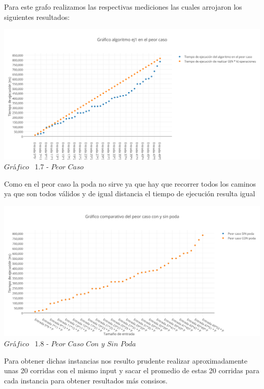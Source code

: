 Para este grafo realizamos las respectivas mediciones las cuales arrojaron los siguientes resultados:\\


\vspace*{0.3cm} \vspace*{0.3cm}
  \begin{center}
\includegraphics[scale=0.65]{./EJ1/peorcaso.png}
{$Gr$\'a$fico$ \ 1.7 - $Peor$ $Caso$}
  \end{center}
  \vspace*{0.3cm}

Como en el peor caso la poda no sirve ya que hay que recorrer todos los caminos ya que son todos v\'alidos y de igual distancia el tiempo de ejecuci\'on resulta igual

\vspace*{0.3cm} \vspace*{0.3cm}
  \begin{center}
 \includegraphics[scale=0.65]{./EJ1/peorcaso1.png}
 {$Gr$\'a$fico$ \ 1.8 - $Peor$ $Caso$ $Con$ $y$ $Sin$ $Poda$}
  \end{center}
   \vspace*{0.3cm}
  
 Para obtener dichas instancias nos resulto prudente realizar aproximadamente unas 20 corridas con el mismo input y sacar el promedio de estas 20 corridas para cada instancia para obtener resultados m\'as consisos.\\ 

